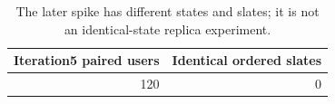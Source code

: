 \begin{table}[htbp!]
\centering
\small
\setlength{\tabcolsep}{3pt}
\renewcommand{\arraystretch}{1.1}
\begin{tabular}{rr}
\hline
Iteration5 paired users & Identical ordered slates \\
\hline
120 & 0 \\
\hline
\end{tabular}
\caption{The later spike has different states and slates; it is not an identical-state replica experiment.}
\label{chap:results:tab:rq1_spike_later_context}
\end{table}
